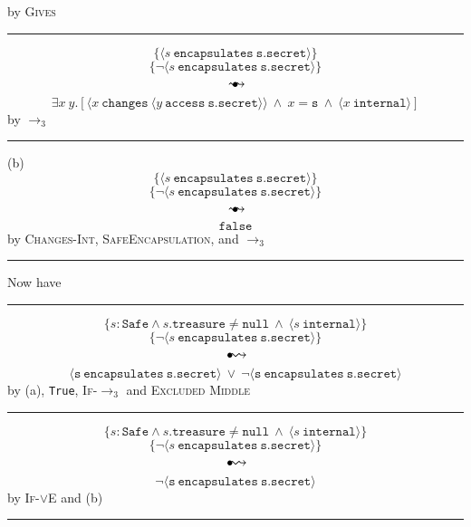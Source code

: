 \documentclass[12pt]{article}
\newcommand\trans{\mathlarger{\mathlarger \leadsto}}
\newcommand\oi{\hspace{1mm}{\raisebox{1pt}{$\bullet$}}\hspace{-1mm}{\trans}}
\newcommand\ot{\hspace{2mm}{\raisebox{1pt}{$\bullet$}}\hspace{-3mm}{\trans}}
\newcommand\encapsulates[2]{\langle #1\ \texttt{encapsulates}\ #2 \rangle}
\newcommand\changes[2]{\langle #1\ \texttt{changes}\ #2 \rangle}
\newcommand\access[2]{\langle #1\ \texttt{access}\ #2 \rangle}
\newcommand\internal[1]{\langle #1\ \texttt{internal}\rangle}
\numberwithin{case}{lemma}
\numberwithin{case}{theorem}
\numberwithin{subcase}{case}
\begin{document}
\hfill by \textsc{Gives}
\hrule
\vspace{3mm}
$$
	\{\encapsulates{s}{\texttt{s.secret}} \}
$$
$$
	\{\neg \encapsulates{s}{\texttt{s.secret}} \}
$$
$$\ot$$
$$
	\exists x\ y.[\changes{x}{\access{y}{\texttt{s.secret}}}\ \wedge\ x = \texttt{s}\ \wedge\ \internal{x}]
$$
\hfill by $\longrightarrow_3$
\hrule
\vspace{3mm}
(b)
$$
	\{\encapsulates{s}{\texttt{s.secret}} \}
$$
$$
	\{\neg \encapsulates{s}{\texttt{s.secret}} \}
$$
$$\ot$$
$$
	\texttt{false}
$$
\hfill by \textsc{Changes-Int}, \textsc{SafeEncapsulation}, and $\longrightarrow_3$
\hrule
\vspace{3mm}
\normalsize
Now have
\vspace{3mm}
\hrule
\footnotesize
\vspace{3mm}
$$
	\{ s : \texttt{Safe} \wedge s.\texttt{treasure} \neq \texttt{null}\ \wedge\ \internal{s} \}
$$
$$
	\{\neg \encapsulates{s}{\texttt{s.secret}} \}
$$
$$\oi$$
$$
	\encapsulates{\texttt{s}}{\texttt{s.secret}}\ \vee\ \neg \encapsulates{\texttt{s}}{\texttt{s.secret}}
$$
\hfill by (a), \texttt{True}, \textsc{If-}$\longrightarrow_3$ and \textsc{Excluded Middle}\\
\hrule
\vspace{3mm}
$$
	\{ s : \texttt{Safe} \wedge s.\texttt{treasure} \neq \texttt{null}\ \wedge\ \internal{s} \}
$$
$$
	\{\neg \encapsulates{s}{\texttt{s.secret}} \}
$$
$$\oi$$
$$
	\neg \encapsulates{\texttt{s}}{\texttt{s.secret}}
$$
\hfill by \textsc{If-}$\vee$\textsc{E} and (b)\\
\hrule
\vspace{3mm}
\normalsize

\newpage
\end{document}
